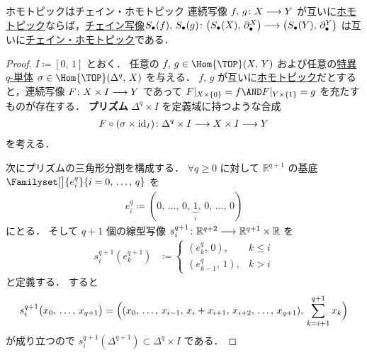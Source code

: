\documentclass[algtopo_main]{subfiles}
\begin{document}
\begin{myprop}[label=prop:homotopyInvariance]{ホモトピックはチェイン・ホモトピック}
    連続写像 $f,\, g \colon X \longrightarrow Y$ が互いに\hyperref[def:homotopic]{ホモトピック}ならば，\hyperref[def:chainmap]{チェイン写像}$S_\bullet(f),\, S_\bullet(g) \colon \bigl( S_\bullet(X),\, \partial_\bullet^X \bigr) \longrightarrow \bigl( S_\bullet (Y),\, \partial_\bullet^Y \bigr)$ は互いに\hyperref[def:chainHomotopy]{チェイン・ホモトピック}である．
\end{myprop}

\begin{proof}
    $I \coloneqq [0,\, 1]$ とおく．
    任意の $f,\, g \in \Hom{\TOP}(X,\, Y)$ および任意の\hyperref[def:singularsimplex]{特異 $q$-単体} $\sigma \in \Hom{\TOP}(\Delta^q,\, X)$ を与える．
    $f,\, g$ が互いに\hyperref[def:homotopic]{ホモトピック}だとすると，連続写像 $F \colon X \times I \longrightarrow Y$ であって $F|_{X \times \{0\}} = f \AND F|_{Y \times \{1\}} = g$ を充たすものが存在する．
    \textbf{プリズム} $\Delta^q \times I$ を定義域に持つような合成
    \begin{align}
        F \circ (\sigma \times \mathrm{id}_I) \colon \Delta^q \times I \longrightarrow X \times I \longrightarrow Y
    \end{align}
    を考える．

    次にプリズムの三角形分割を構成する．
    $\forall q \ge 0$ に対して $\mathbb{R}^{q+1}$ の基底 $\Familyset[\big]{e_i^q}{i = 0,\, \dots ,\, q}$ を
    \begin{align}
        e^q_i \coloneqq (0,\, \dots ,\, 0 ,\, \underbrace{1}_i ,\, 0 ,\,  \dots ,\, 0)
    \end{align}
    にとる．
    そして $q+1$ 個の線型写像 $s_i^{q+1} \colon \mathbb{R}^{q+2} \longrightarrow \mathbb{R}^{q+1} \times \mathbb{R}$ を
    \begin{align}
        s_i^{q+1}(e^{q+1}_k) &\coloneqq
        \begin{cases}
            (e_k^q,\, 0), &k \le i \\
            (e_{k-1}^q,\, 1), &k > i
        \end{cases}
    \end{align}
    と定義する．
    すると 
    \begin{align}
        s_i^{q+1} \bigl( x_0,\, \dots ,\, x_{q+1} \bigr) = \Bigl( (x_0,\, \dots,\, x_{i-1},\, x_i + x_{i+1},\, x_{i+2},\, \dots,\, x_{q+1}),\, \sum_{k=i+1}^{q+1} x_k \Bigr) 
    \end{align}
    が成り立つので $s_i^{q+1}(\Delta^{q+1}) \subset \Delta^{q} \times I$ である．
    

\end{proof}
\end{document}
